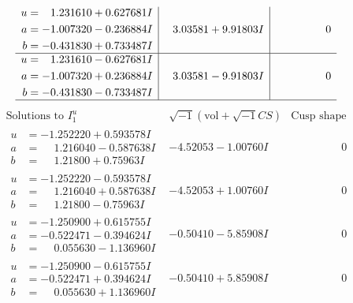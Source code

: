 \documentclass[1p]{elsarticle_modified}
\theoremstyle{definition}
\newcommand{\I}{\sqrt{-1}}
\begin{document}
$$\begin{array}{c|c|c}
\begin{aligned}
u &= \phantom{-}1.231610 + 0.627681 I \\
a &= -1.007320 - 0.236884 I \\
b &= -0.431830 + 0.733487 I\end{aligned}
 & \phantom{-}3.03581 + 9.91803 I & \phantom{-0.000000 } 0 \\ \hline\begin{aligned}
u &= \phantom{-}1.231610 - 0.627681 I \\
a &= -1.007320 + 0.236884 I \\
b &= -0.431830 - 0.733487 I\end{aligned}
 & \phantom{-}3.03581 - 9.91803 I & \phantom{-0.000000 } 0\\
 \hline 
 \end{array}$$\newpage$$\begin{array}{c|c|c}  
\text{Solutions to }I^u_{1}& \I (\text{vol} + \sqrt{-1}CS) & \text{Cusp shape}\\
 \hline 
\begin{aligned}
u &= -1.252220 + 0.593578 I \\
a &= \phantom{-}1.216040 - 0.587638 I \\
b &= \phantom{-}1.21800 + 0.75963 I\end{aligned}
 & -4.52053 - 1.00760 I & \phantom{-0.000000 } 0 \\ \hline\begin{aligned}
u &= -1.252220 - 0.593578 I \\
a &= \phantom{-}1.216040 + 0.587638 I \\
b &= \phantom{-}1.21800 - 0.75963 I\end{aligned}
 & -4.52053 + 1.00760 I & \phantom{-0.000000 } 0 \\ \hline\begin{aligned}
u &= -1.250900 + 0.615755 I \\
a &= -0.522471 - 0.394624 I \\
b &= \phantom{-}0.055630 - 1.136960 I\end{aligned}
 & -0.50410 - 5.85908 I & \phantom{-0.000000 } 0 \\ \hline\begin{aligned}
u &= -1.250900 - 0.615755 I \\
a &= -0.522471 + 0.394624 I \\
b &= \phantom{-}0.055630 + 1.136960 I\end{aligned}
 & -0.50410 + 5.85908 I & \phantom{-0.000000 } 0 \\ \hline\begin{aligned}

\end{aligned}
\end{array}$$
\end{document}
